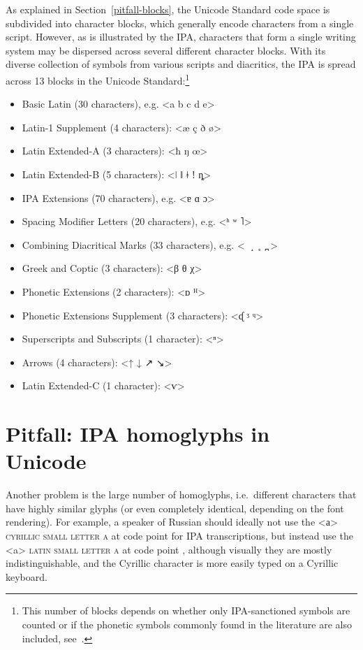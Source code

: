 As explained in Section~\ref{pitfall-blocks}, the Unicode Standard code space is
subdivided into character blocks, which generally encode characters from a
single script. However, as is illustrated by the IPA, characters that form a
single writing system may be dispersed across several different character
blocks. With its diverse collection of symbols from various scripts and
diacritics, the IPA is spread across 13 blocks in the Unicode
Standard:\footnote{This number of blocks depends on whether only IPA-sanctioned
symbols are counted or if the phonetic symbols commonly found in the literature
are also included, see~\cite[Appendix~C]{Moran2012}.}

\begin{itemize}
	\item Basic Latin (30 characters), e.g. <a b c d e> 
	\item Latin-1 Supplement (4 characters): <æ ç ð ø> 
	\item Latin Extended-A (3 characters): <ħ ŋ œ> 
	\item Latin Extended-B (5 characters): <ǀ ǁ ǂ ǃ ȵ> 
	\item IPA Extensions (70 characters), e.g. <ɐ ɑ ɔ> 
	\item Spacing Modifier Letters (20 characters), e.g. <ʰ ʷ ˥> 
	\item Combining Diacritical Marks (33 characters), e.g. <{\large \ \ ̝\ \ ̥\ \ ̪ }> 
	\item Greek and Coptic (3 characters): <β θ χ> 
	\item Phonetic Extensions (2 characters): <{\small {}ᴅ ᴴ}> 
	\item Phonetic Extensions Supplement (3 characters): <{\small {}ᶑ ᶾ ᶣ}> 
	\item Superscripts and Subscripts (1 character): <ⁿ> 
	\item Arrows (4 characters): <↑ ↓ ↗ ↘>
	\item Latin Extended-C (1 character): <{\small {}ⱱ}> 
\end{itemize}

\section{Pitfall: IPA homoglyphs in Unicode}
\label{pitfall-ipa-homoglyphs}

Another problem is the large number of homoglyphs, i.e.~different characters
that have highly similar glyphs (or even completely identical, depending on the
font rendering). For example, a speaker of Russian should ideally not use the
<а> \textsc{cyrillic small letter a} at code point  for IPA
transcriptions, but instead use the <a> \textsc{latin small letter a} at code point
, although visually they are mostly indistinguishable, and the
Cyrillic character is more easily typed on a Cyrillic keyboard. 

